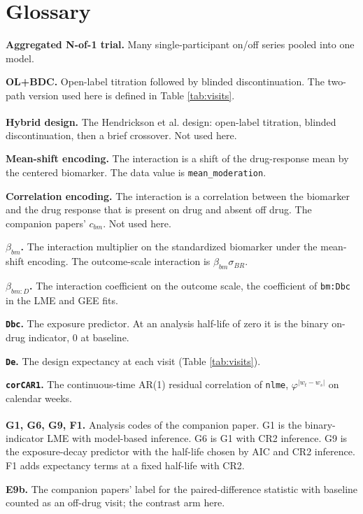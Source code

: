 \documentclass[
  11pt,
]{article}
\begin{document}
\section{Glossary}\label{glossary}

\textbf{Aggregated N-of-1 trial.} Many single-participant on/off series
pooled into one model.

\textbf{OL+BDC.} Open-label titration followed by blinded discontinuation.
The two-path version used here is defined in Table
\ref{tab:visits}.

\textbf{Hybrid design.} The Hendrickson et al.\textsuperscript{} design: open-label titration,
blinded discontinuation, then a brief crossover. Not used here.

\textbf{Mean-shift encoding.} The interaction is a shift of the
drug-response mean by the centered biomarker. The data value is
\texttt{mean\_moderation}.

\textbf{Correlation encoding.} The interaction is a correlation between
the biomarker and the drug response that is present on drug and
absent off drug. The companion papers' \(c_{bm}\). Not used here.

\textbf{\(\beta_{bm}\).} The interaction multiplier on the standardized
biomarker under the mean-shift encoding. The outcome-scale
interaction is \(\beta_{bm} \sigma_{BR}\).

\textbf{\(\beta_{bm:D}\).} The interaction coefficient on the outcome scale,
the coefficient of \texttt{bm:Dbc} in the LME and GEE fits.

\textbf{\texttt{Dbc}.} The exposure predictor. At an analysis half-life of zero
it is the binary on-drug indicator, 0 at baseline.

\textbf{\texttt{De}.} The design expectancy at each visit (Table
\ref{tab:visits}).

\textbf{\texttt{corCAR1}.} The continuous-time AR(1) residual correlation of
\texttt{nlme}, \(\varphi^{|w_t - w_s|}\) on calendar weeks.

\textbf{G1, G6, G9, F1.} Analysis codes of the companion paper\textsuperscript{}. G1 is the binary-indicator LME with
model-based inference. G6 is G1 with CR2 inference. G9 is the
exposure-decay predictor with the half-life chosen by AIC and CR2
inference. F1 adds expectancy terms at a fixed half-life with CR2.

\textbf{E9b.} The companion papers' label for the paired-difference
statistic with baseline counted as an off-drug visit; the contrast
arm here.
\end{document}
